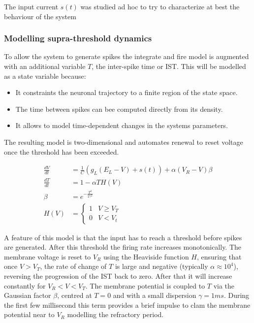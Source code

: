 		The input current $s(t)$ was studied ad hoc to try to characterize at best the behaviour of the system

		\subsubsection{Modelling supra-threshold dynamics}
		To allow the system to generate spikes the integrate and fire model is augmented with an additional variable $T$, the inter-spike time or IST.
		This will be modelled as a state variable because:

		\begin{itemize}
			\item It constraints the neuronal trajectory to a finite region of the state space.
			\item The time between spikes can bee computed directly from its density.
			\item It allows to model time-dependent changes in the systems parameters.
		\end{itemize}

		The resulting model is two-dimensional and automates renewal to reset voltage once the threshold has been exceeded.


		\begin{equation}
			\begin{aligned}
				\frac{dV}{dt} &= \frac{1}{C}(g_L(E_L-V)+s(t)) + \alpha(V_R-V)\beta\\
				\frac{dT}{dt} &= 1-\alpha TH(V)\\
				\beta &=e^{-\frac{T^2}{2\gamma^2}}\\
				H(V) &= \begin{cases}1 & V\ge V_T\\0&V < V_t\end{cases}
				\label{eqs:supra-threshold}
			\end{aligned}
		\end{equation}

		A feature of this model is that the input has to reach a threshold before spikes are generated.
		After this threshold the firing rate increases monotonically.
		The membrane voltage is reset to $V_R$ using the Heaviside function $H$, ensuring that once $V>V_T$, the rate of change of $T$ is large and negative (typically $\alpha\approx 10^4$), reversing the progression of the IST back to zero.
		After that it will increase constantly for $V_R<V<V_T$.
		The membrane potential is coupled to $T$ via the Gaussian factor $\beta$, centred at $T=0$ and with a small dispersion $\gamma=1ms$.
		During the first few millisecond this term provides a brief impulse to clam the membrane potential near to $V_R$ modelling the refractory period.

